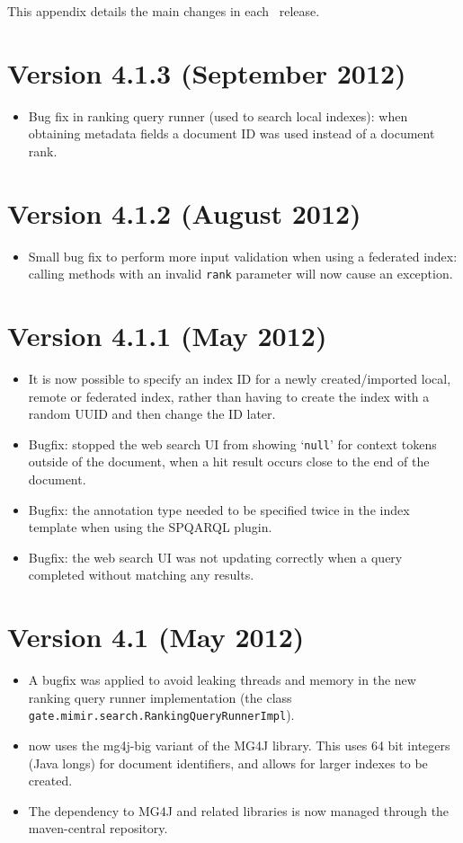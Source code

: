 This appendix details the main changes in each \Mimir\ release.

\section{Version 4.1.3 (September 2012)}
\begin{itemize}
  \item Bug fix in ranking query runner (used to search local indexes): when
  obtaining metadata fields a document ID was used instead of a document rank.
\end{itemize}
\section{Version 4.1.2 (August 2012)}
\begin{itemize}
  \item Small bug fix to perform more input validation when using a federated 
  index: calling methods with an invalid {\tt rank} parameter will now cause an 
  exception. 
\end{itemize}
\section{Version 4.1.1 (May 2012)}
\begin{itemize}
\item It is now possible to specify an index ID for a newly created/imported
  local, remote or federated index, rather than having to create the index with
  a random UUID and then change the ID later.
\item Bugfix: stopped the web search UI from showing `{\tt null}' for context
  tokens outside of the document, when a hit result occurs close to the end of
  the document.
\item Bugfix: the annotation type needed to be specified twice in the index
  template when using the SPQARQL plugin.
\item Bugfix: the web search UI was not updating correctly when a query
  completed without matching any results.   
\end{itemize}

\section{Version 4.1 (May 2012)}
\begin{itemize}
\item A bugfix was applied to avoid leaking threads and memory in the new
  ranking query runner implementation (the class {\tt gate.mimir.search.RankingQueryRunnerImpl}).
\item \Mimir{} now uses the mg4j-big variant of the MG4J library. This uses
  64 bit integers (Java longs) for document identifiers, and allows for larger
  indexes to be created.
\item The dependency to MG4J and related libraries is now managed through the
  maven-central repository.
\end{itemize}

